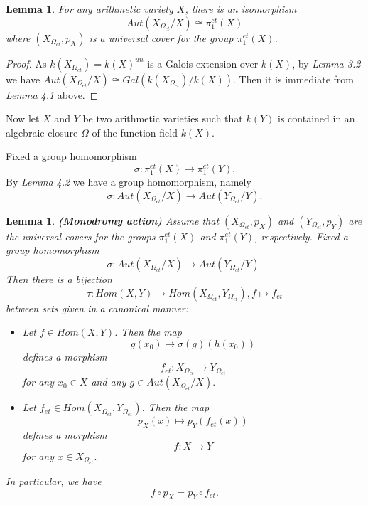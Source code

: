 \documentclass[12pt,twoside,reqno]{amsart}
\newtheorem{lemma}[theorem]{Lemma}
\theoremstyle{definition}
\numberwithin{equation}{section}
\begin{document}
\begin{lemma}
For any arithmetic variety $X$, there is an isomorphism
$$Aut\left( X_{\Omega _{et}}/X\right)
 \cong \pi _{1}^{et}\left( X\right)$$
 where $\left( X_{\Omega _{et}},p_{X}\right)$ is a universal cover for the group $\pi_{1}^{et}(X)$.
\end{lemma}

\begin{proof}
As $ k\left( X_{\Omega _{et}}\right)=k(X)^{un}$ is a Galois extension over $k(X)$, by \emph{Lemma 3.2} we have $Aut\left( X_{\Omega _{et}}/X\right) \cong Gal\left( k\left( X_{\Omega
_{et}}\right) /k\left( X\right) \right)$. Then it is immediate from \emph{Lemma 4.1} above.
\end{proof}

Now let $X$ and $Y$ be two arithmetic varieties such that $k\left( Y\right) $ is
contained in an algebraic closure $\Omega $ of the function field $k\left( X\right) .$

Fixed a group homomorphism $$\sigma :\pi _{1}^{et}\left( X\right) \rightarrow
\pi _{1}^{et}\left( Y\right) .$$ By \emph{Lemma 4.2} we have a group homomorphism, namely $$
\sigma :Aut\left( X_{\Omega _{et}}/X\right) \rightarrow Aut\left( Y_{\Omega
_{et}}/Y\right) .$$

\begin{lemma}
\emph{\textbf{(Monodromy action)}}
Assume that $\left( X_{\Omega _{et}},p_{X}\right)$ and $\left( Y_{\Omega _{et}},p_{Y}\right)$ are the universal covers for the groups $\pi_{1}^{et}(X)$ and $\pi_{1}^{et}(Y)$, respectively.
Fixed a group homomorphism $$\sigma :Aut\left( X_{\Omega
_{et}}/X\right) \rightarrow Aut\left( Y_{\Omega _{et}}/Y\right) .$$ Then
there is a bijection $$\tau :Hom\left( X,Y\right) \to Hom\left( X_{\Omega _{et}},Y_{\Omega _{et}}\right) , f\mapsto f_{et}$$ between sets given in a canonical manner:
\begin{itemize}
\item Let $f\in Hom\left( X,Y\right)$. Then the map $$g\left( x_{0}\right)
\longmapsto \sigma \left( g\right) \left( h\left( x_{0}\right) \right) $$
defines a morphism $$f_{et}:X_{\Omega _{et}}\rightarrow Y_{\Omega _{et}}$$
for any $x_{0}\in X$ and any $g\in Aut\left( X_{\Omega _{et}}/X\right) .$

\item Let $f_{et}\in Hom\left( X_{\Omega _{et}},Y_{\Omega _{et}}\right)$. Then the map $$
p_{X}\left( x\right) \longmapsto p_{Y}\left( f_{et}\left( x\right) \right)
$$ defines a morphism $$f:X\rightarrow Y$$ for any $x\in X_{\Omega _{et}}.$
\end{itemize}
In particular, we have $$f\circ p_{X}=p_{Y}\circ f_{et}.$$
\end{lemma}
\end{document}
